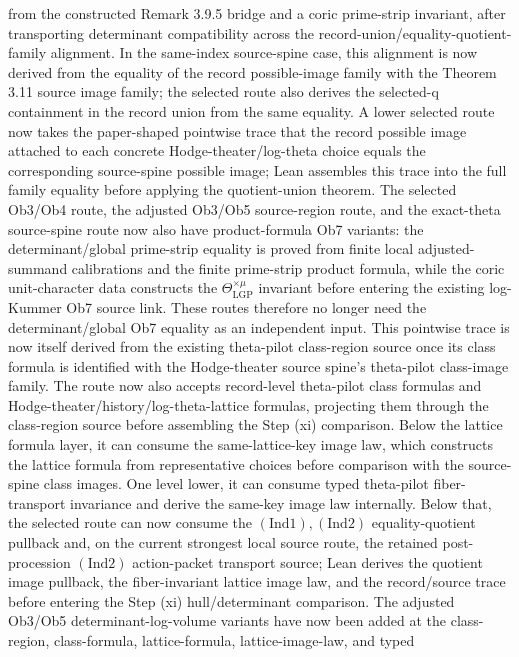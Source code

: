 \documentclass[11pt]{article}
\theoremstyle{plain}
\theoremstyle{definition}
\theoremstyle{remark}
\begin{document}
from the constructed Remark 3.9.5 bridge and a coric prime-strip invariant,
after transporting determinant compatibility across the
record-union/equality-quotient-family alignment.  In the same-index
source-spine case, this alignment is now derived from the equality of the
record possible-image family with the Theorem 3.11 source image family; the
selected route also derives the selected-q containment in the record union
from the same equality.  A lower selected route now takes the paper-shaped
pointwise trace that the record possible image attached to each concrete
Hodge-theater/log-theta choice equals the corresponding source-spine possible
image; Lean assembles this trace into the full family equality before applying
the quotient-union theorem.  The selected Ob3/Ob4 route, the adjusted Ob3/Ob5
source-region route, and the exact-theta source-spine route now also have
product-formula Ob7 variants: the determinant/global prime-strip equality is
proved from finite local adjusted-summand calibrations and the finite
prime-strip product formula, while the coric unit-character data constructs
the \(\Theta^{\times\mu}_{\mathrm{LGP}}\) invariant before entering the
existing log-Kummer Ob7 source link.  These routes therefore no longer need
the determinant/global Ob7 equality as an independent input.  This pointwise
trace is now itself derived from the existing theta-pilot class-region source
once its class formula is identified with the Hodge-theater source spine's
theta-pilot class-image family.  The route now also accepts record-level
theta-pilot class formulas and
Hodge-theater/history/log-theta-lattice formulas, projecting them through the
class-region source before assembling the Step (xi) comparison.  Below the
lattice formula layer, it can consume the same-lattice-key image law, which
constructs the lattice formula from representative choices before comparison
with the source-spine class images.  One level lower, it can consume typed
theta-pilot fiber-transport invariance and derive the same-key image law
internally.  Below that, the selected route can now consume the
\((\mathrm{Ind}1),(\mathrm{Ind}2)\) equality-quotient pullback and, on the
current strongest local source route, the retained post-procession
\((\mathrm{Ind}2)\) action-packet transport source; Lean derives the quotient
image pullback, the fiber-invariant lattice image law, and the record/source
trace before entering the Step (xi) hull/determinant comparison.  The
adjusted Ob3/Ob5 determinant-log-volume variants have now been added at the
class-region, class-formula, lattice-formula, lattice-image-law, and typed
\end{document}
